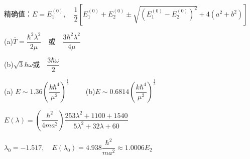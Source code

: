 		精确值：$  E=E_{1}^{(0)},\quad \dfrac{1}{2}[E_{1}^{(0)}+E_{2}^{(0)}\pm\sqrt{(E_{1}^{(0)}-E_{2}^{(0)})^{2}}+4(a^{2}+b^{2})] $

\answer (a)$ \bar{T}=\dfrac{\hbar^{2}\lambda^{2}}{2\mu}\quad $或$\quad \dfrac{3\hbar^{2}\lambda^{2}}{4\mu} $

		(b)$ \sqrt{3}\hbar\omega $或$\quad \dfrac{3\hbar\omega}{2} $

\answer (a) $ E\sim1.36\left(\dfrac{k\hbar^{4}}{\mu^{2}}\right)^{\frac{1}{3}}\qquad $ (b)$ E\sim\num{0.6814}\left(\dfrac{k\hbar^{4}}{\mu^{2}}\right)^{\frac{1}{3}} $

\answer $ E(\lambda)=\left(\dfrac{\hbar^{2}}{4ma^{2}}\right)\dfrac{\num{253}\lambda^{2}+\num{1100}+\num{1540}}{5\lambda^{2}+32\lambda+60} $	

		$ \lambda_{0}=-\num{1.517},\quad E(\lambda_{0})=\num{4.938}\dfrac{\hbar^{2}}{ma^{2}}\approx\num{1.0006}E_{2} $



